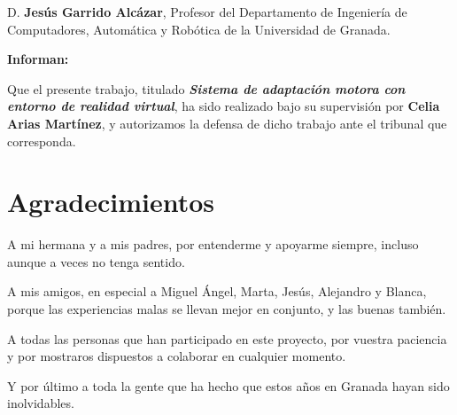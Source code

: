 D. \textbf{Jesús Garrido Alcázar}, Profesor  del Departamento de Ingeniería de Computadores, Automática y Robótica de la Universidad de Granada.


\vspace{0.5cm}

\textbf{Informan:}

\vspace{0.5cm}

Que el presente trabajo, titulado \textit{\textbf{Sistema de adaptación motora con entorno de realidad virtual}},
ha sido realizado bajo su supervisión por \textbf{Celia Arias Martínez}, y autorizamos la defensa de dicho trabajo ante el tribunal
que corresponda.

\vspace{0.5cm}






\chapter*{Agradecimientos}
\thispagestyle{empty}

       \vspace{1cm}


A mi hermana y a mis padres, por entenderme y apoyarme siempre, incluso aunque a veces no tenga sentido.


A mis amigos, en especial a Miguel Ángel, Marta, Jesús, Alejandro y Blanca, porque las experiencias malas se llevan mejor en conjunto, y las buenas también. 

A todas las personas que han participado en este proyecto, por vuestra paciencia y por mostraros dispuestos a colaborar en cualquier momento.

Y por último a toda la gente que ha hecho que estos años en Granada hayan sido inolvidables.


